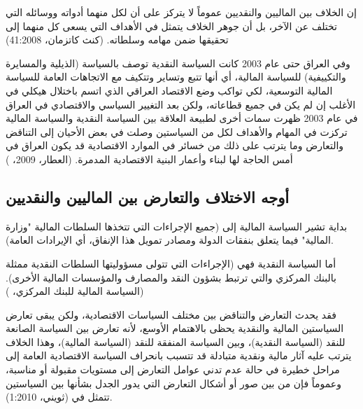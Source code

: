 \documentclass[10pt,a4paper]{report}
\begin{document}
\begin{doublespacing}
إن الخلاف بين الماليين والنقديين عموماً لا يتركز على أن لكل منهما أدواته ووسائله التي تختلف عن الآخر، بل أن جوهر الخلاف يتمثل في الأهداف التي يسعى كل منهما إلى تحقيقها ضمن مهامه وسلطاته. ({كنث كاتزمان، 41:2008})

وفي العراق حتى عام 2003 كانت السياسة النقدية توصف بالسياسة (الذيلية والمسايرة والتكييفية) للسياسة المالية، أي أنها تتبع وتساير وتتكيف مع الاتجاهات العامة للسياسة المالية التوسعية، لكي تواكب وضع الاقتصاد العراقي الذي اتسم باختلال هيكلي في الأغلب إن لم يكن في جميع قطاعاته، ولكن بعد التغيير السياسي والاقتصادي في العراق في عام 2003 ظهرت سمات أخرى لطبيعة العلاقة بين السياسة النقدية والسياسة المالية تركزت في المهام والأهداف لكل من السياستين وصلت في بعض الأحيان إلى التناقض والتعارض وما يترتب على ذلك من خسائر في الموارد الاقتصادية قد يكون العراق في أمس الحاجة لها لبناء وأعمار البنية الاقتصادية المدمرة. ({العطار، 2009، })
\subsection{أوجه الاختلاف والتعارض بين الماليين والنقديين}
بداية تشير السياسة المالية إلى (جميع الإجراءات التي تتخذها السلطات المالية "وزارة المالية" فيما يتعلق بنفقات الدولة ومصادر تمويل هذا الإنفاق، أي الإيرادات العامة).

أما السياسة النقدية فهي (الإجراءات التي تتولى مسؤوليتها السلطات النقدية ممثلة بالبنك المركزي والتي ترتبط بشؤون النقد والمصارف والمؤسسات المالية الأخرى). ({السياسة المالية للبنك المركزي، })

فقد يحدث التعارض والتناقض بين مختلف السياسات الاقتصادية، ولكن يبقى تعارض السياستين المالية والنقدية يحظى بالاهتمام الأوسع، لأنه تعارض بين السياسة الصانعة للنقد (السياسة النقدية)، وبين السياسة المنفقة للنقد (السياسة المالية)، وهذا الخلاف يترتب عليه آثار مالية ونقدية متبادلة قد تتسبب بانحراف السياسة الاقتصادية العامة إلى مراحل خطيرة في حالة عدم تدني عوامل التعارض إلى مستويات مقبولة أو مناسبة، وعموماً فإن من بين صور أو أشكال التعارض التي يدور الجدل بشأنها بين السياستين تتمثل في ({ثويني، 1:2010}).


\end{doublespacing}
\end{document}

